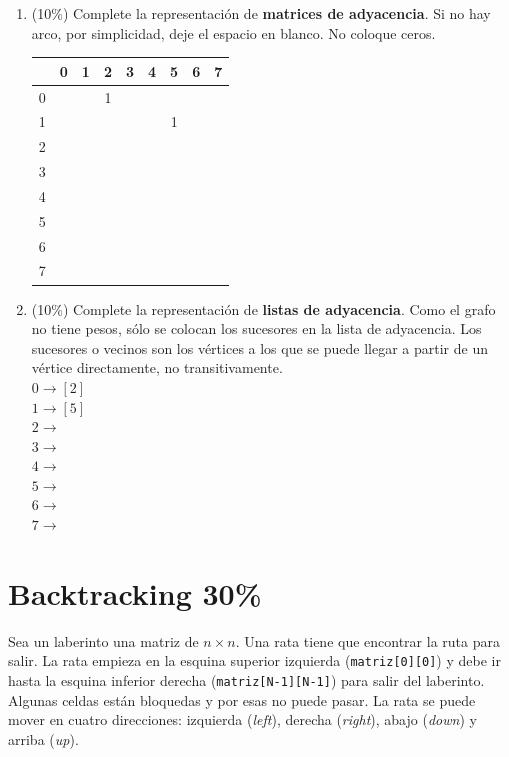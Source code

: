 \documentclass[twocolumn]{article}
\begin{document}
\begin{enumerate}[label=\Alph*]
	\item (10\%) Complete la representación de \textbf{matrices de adyacencia}. Si no hay arco,
  por simplicidad, deje el espacio en blanco. No coloque ceros.

\begin{center}
\begin{tabular}{| c | c | c | c | c | c | c | c | c |}
\hline
  & 0 & 1 & 2 & 3 & 4 & 5 & 6 & 7 \\
\hline
0 &   &   & 1  &  &   &   &   &   \\
\hline
1 &   &   &   &   &   & 1  &   &   \\
\hline
2 &   &   &   &   &   &   &   &   \\
\hline
3 &   &   &   &   &   &   &   &   \\
\hline
4 &   &   &   &   &   &   &   &   \\
\hline
5 &   &   &   &   &   &   &   &   \\
\hline
6 &   &   &   &   &   &   &   &   \\
\hline
7 &   &   &   &   &   &   &   &   \\ 
\hline
\end{tabular}
\end{center}

	\item (10\%) Complete la representación de \textbf{listas de adyacencia}. Como
  el grafo no tiene pesos, sólo se colocan los sucesores en la lista de adyacencia.
  Los sucesores o vecinos son los vértices a los que se puede llegar a partir de
  un vértice directamente, no transitivamente. \\


$0 \rightarrow [2]$\\
$1 \rightarrow [5]$ \\
$2 \rightarrow$\\
$3 \rightarrow$\\
$4 \rightarrow$\\
$5 \rightarrow$\\
$6 \rightarrow$\\
$7 \rightarrow$\\


\end{enumerate}





\section{Backtracking 30\%}
Sea un laberinto una matriz de $n \times n$. Una rata tiene que encontrar la ruta para salir. La rata empieza
en la esquina superior izquierda (\texttt{matriz[0][0]}) y debe ir hasta la esquina inferior derecha (\texttt{matriz[N-1][N-1]}) 
para salir del laberinto. Algunas celdas están bloquedas y por esas no puede pasar. La rata se puede mover en cuatro direcciones:
izquierda (\emph{left}), derecha (\emph{right}), abajo (\emph{down}) y arriba (\emph{up}).
\end{document}

